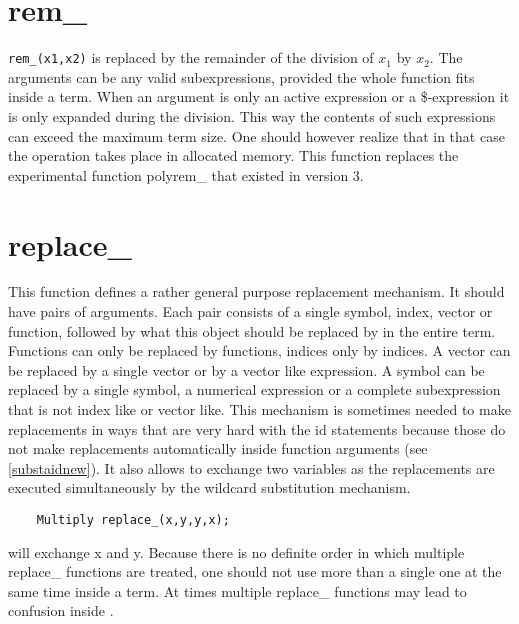 
\section{rem\_}
\label{funrem}
\noindent \verb:rem_(x1,x2): is replaced by the remainder of the division 
of $x_1$ by $x_2$. The arguments can be any valid subexpressions, provided 
the whole function fits inside a term. When an argument is only an active 
expression or a \$-expression it is only expanded during the division. This 
way the contents of such expressions can exceed the maximum term size. One 
should however realize that in that case the operation takes place in 
allocated memory.
This function replaces the experimental function 
polyrem\_ that existed in 
version 3.


\section{replace\_}
\label{funreplace}
\noindent This function defines a rather general purpose 
replacement mechanism. It should have pairs of 
arguments. Each pair consists of a single symbol, index, vector or 
function, followed by what this object should be replaced by in the entire 
term. Functions can only be replaced by functions, indices only by indices. 
A vector can be replaced by a single vector or by a vector like expression. 
A symbol can be replaced by a single symbol, a numerical expression or a 
complete subexpression that is not index like or vector like. This 
mechanism is sometimes needed to make replacements in ways that are very 
hard with the id statements because those do not make 
replacements automatically inside function arguments (see 
\ref{substaidnew}). It also allows to exchange two variables as the 
replacements are executed simultaneously by the wildcard substitution 
mechanism.
\begin{verbatim}
    Multiply replace_(x,y,y,x);
\end{verbatim}
will exchange x and y. Because there is no definite order in which multiple 
replace\_ functions are treated, one should not use more than a single one 
at the same time inside a term. At times multiple replace\_ functions may 
lead to confusion inside \FORM.

